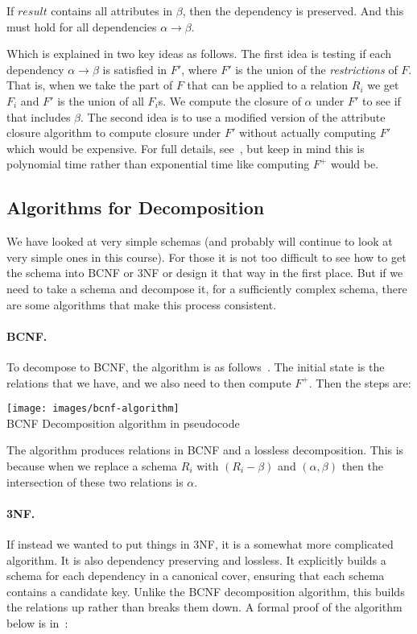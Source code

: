 \documentclass[a4paper]{report}
\begin{document}
If $result$ contains all attributes in $\beta$, then the dependency is preserved. And this must hold for all dependencies $\alpha \rightarrow \beta$.

Which is explained in two key ideas as follows. The first idea is testing if each dependency $\alpha \rightarrow \beta$ is satisfied in $F'$, where $F'$ is the union of the \textit{restrictions} of $F$. That is, when we take the part of $F$ that can be applied to a relation $R_{i}$ we get $F_{i}$ and $F'$ is the union of all $F_{i}$s. We compute the closure of $\alpha$ under $F'$ to see if that includes $\beta$. The second idea is to use a modified version of the attribute closure algorithm to compute closure under $F'$ without actually computing $F'$ which would be expensive. For full details, see~\cite{dsc}, but keep in mind this is polynomial time rather than exponential time like computing $F^{+}$ would be.

\subsection*{Algorithms for Decomposition}

We have looked at very simple schemas (and probably will continue to look at very simple ones in this course). For those it is not too difficult to see how to get the schema into BCNF or 3NF or design it that way in the first place. But if we need to take a schema and decompose it, for a sufficiently complex schema, there are some algorithms that make this process consistent.

\paragraph{BCNF.}To decompose to BCNF, the algorithm is as follows~\cite{dsc}. The initial state is the relations that we have, and we also need to then compute $F^{+}$. Then the steps are:

\begin{center}
\texttt{[image: images/bcnf-algorithm]}\\
BCNF Decomposition algorithm in pseudocode~\cite{dsc}
\end{center}

The algorithm produces relations in BCNF and a lossless decomposition. This is because when we replace a schema $R_{i}$ with $(R_{i} - \beta)$ and $(\alpha, \beta)$ then the intersection of these two relations is $\alpha$.

\paragraph{3NF.} If instead we wanted to put things in 3NF, it is a somewhat more complicated algorithm. It is also dependency preserving and lossless. It explicitly builds a schema for each dependency in a canonical cover, ensuring that each schema contains a candidate key. Unlike the BCNF decomposition algorithm, this builds the relations up rather than breaks them down. A formal proof of the algorithm below is in~\cite{dsc}: 
\end{document}
